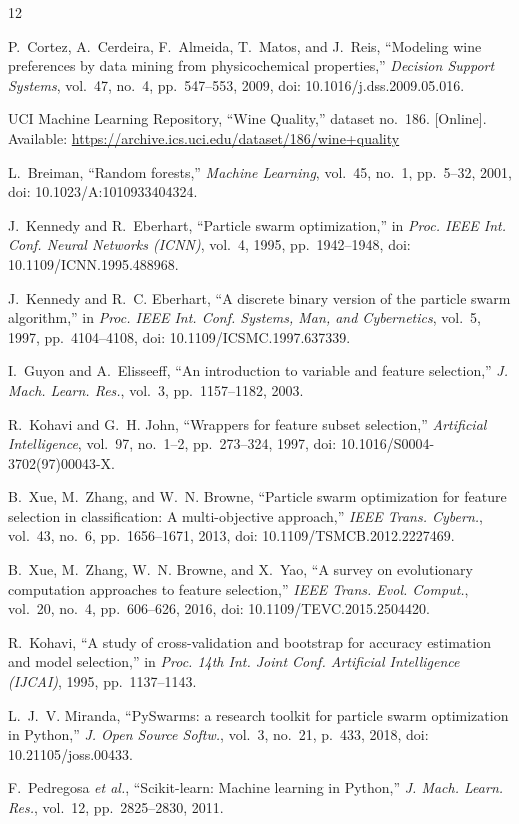 \documentclass[conference]{IEEEtran}
\begin{document}
\begin{thebibliography}{12}

P.~Cortez, A.~Cerdeira, F.~Almeida, T.~Matos, and J.~Reis, ``Modeling wine preferences by data mining from physicochemical properties,'' \emph{Decision Support Systems}, vol.~47, no.~4, pp.~547--553, 2009, doi: 10.1016/j.dss.2009.05.016.

UCI Machine Learning Repository, ``Wine Quality,'' dataset no.~186. [Online]. Available: \url{https://archive.ics.uci.edu/dataset/186/wine+quality}

L.~Breiman, ``Random forests,'' \emph{Machine Learning}, vol.~45, no.~1, pp.~5--32, 2001, doi: 10.1023/A:1010933404324.

J.~Kennedy and R.~Eberhart, ``Particle swarm optimization,'' in \emph{Proc. IEEE Int. Conf. Neural Networks (ICNN)}, vol.~4, 1995, pp.~1942--1948, doi: 10.1109/ICNN.1995.488968.

J.~Kennedy and R.~C. Eberhart, ``A discrete binary version of the particle swarm algorithm,'' in \emph{Proc. IEEE Int. Conf. Systems, Man, and Cybernetics}, vol.~5, 1997, pp.~4104--4108, doi: 10.1109/ICSMC.1997.637339.

I.~Guyon and A.~Elisseeff, ``An introduction to variable and feature selection,'' \emph{J. Mach. Learn. Res.}, vol.~3, pp.~1157--1182, 2003.

R.~Kohavi and G.~H. John, ``Wrappers for feature subset selection,'' \emph{Artificial Intelligence}, vol.~97, no.~1--2, pp.~273--324, 1997, doi: 10.1016/S0004-3702(97)00043-X.

B.~Xue, M.~Zhang, and W.~N. Browne, ``Particle swarm optimization for feature selection in classification: A multi-objective approach,'' \emph{IEEE Trans. Cybern.}, vol.~43, no.~6, pp.~1656--1671, 2013, doi: 10.1109/TSMCB.2012.2227469.

B.~Xue, M.~Zhang, W.~N. Browne, and X.~Yao, ``A survey on evolutionary computation approaches to feature selection,'' \emph{IEEE Trans. Evol. Comput.}, vol.~20, no.~4, pp.~606--626, 2016, doi: 10.1109/TEVC.2015.2504420.

R.~Kohavi, ``A study of cross-validation and bootstrap for accuracy estimation and model selection,'' in \emph{Proc. 14th Int. Joint Conf. Artificial Intelligence (IJCAI)}, 1995, pp.~1137--1143.

L.~J.~V. Miranda, ``PySwarms: a research toolkit for particle swarm optimization in Python,'' \emph{J. Open Source Softw.}, vol.~3, no.~21, p.~433, 2018, doi: 10.21105/joss.00433.

F.~Pedregosa \emph{et al.}, ``Scikit-learn: Machine learning in Python,'' \emph{J. Mach. Learn. Res.}, vol.~12, pp.~2825--2830, 2011.

\end{thebibliography}
\end{document}
